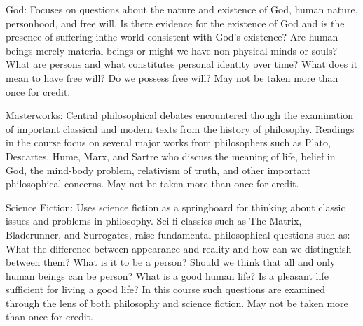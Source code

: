\documentclass[
  letterpaper,
]{scrbook}
\begin{document}
God: Focuses on questions about the nature and existence of God, human
nature, personhood, and free will. Is there evidence for the existence
of God and is the presence of suffering inthe world consistent with
God's existence? Are human beings merely material beings or might we
have non-physical minds or souls? What are persons and what constitutes
personal identity over time? What does it mean to have free will? Do we
possess free will? May not be taken more than once for credit.

Masterworks: Central philosophical debates encountered though the
examination of important classical and modern texts from the history of
philosophy. Readings in the course focus on several major works from
philosophers such as Plato, Descartes, Hume, Marx, and Sartre who
discuss the meaning of life, belief in God, the mind-body problem,
relativism of truth, and other important philosophical concerns. May not
be taken more than once for credit.

Science Fiction: Uses science fiction as a springboard for thinking
about classic issues and problems in philosophy. Sci-fi classics such as
The Matrix, Bladerunner, and Surrogates, raise fundamental philosophical
questions such as: What the difference between appearance and reality
and how can we distinguish between them? What is it to be a person?
Should we think that all and only human beings can be person? What is a
good human life? Is a pleasant life sufficient for living a good life?
In this course such questions are examined through the lens of both
philosophy and science fiction. May not be taken more than once for
credit.
\end{document}
